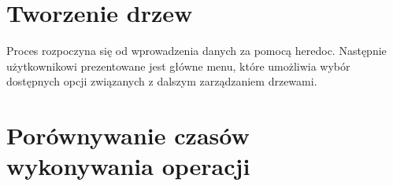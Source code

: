 \documentclass{article}
\begin{document}
    \section{Tworzenie drzew}
    Proces rozpoczyna się od wprowadzenia danych za pomocą heredoc. Następnie użytkownikowi prezentowane jest główne menu, które umożliwia wybór dostępnych opcji związanych z dalszym zarządzaniem drzewami.

    \begin{figure} [H]
		\noindent\resizebox{\textwidth}{!}{
			\centering
            
            }
    \end{figure}
	
	
	\section{Porównywanie czasów wykonywania operacji}
\end{document}
